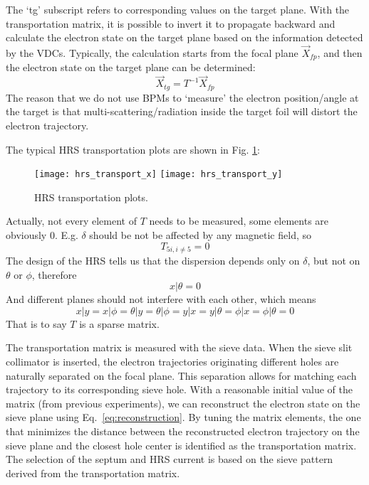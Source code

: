 The `tg' subscript refers to corresponding values on the target plane. 
With the transportation matrix, it is possible to invert it to propagate backward 
and calculate the electron state on the target plane based on the information
detected by the VDCs. Typically, the calculation starts from the focal plane $\vec{X}_{fp}$, 
and then the electron state on the target plane can be determined: 
\begin{equation}
    \vec{X}_{tg} = T^{-1} \vec{X}_{fp}
    \label{eq:reconstruction}
\end{equation}
The reason that we do not use BPMs to `measure' the electron position/angle at 
the target is that multi-scattering/radiation inside the target foil will 
distort the electron trajectory. 

The typical HRS transportation plots are shown in Fig. \ref{fig:hrs_transport}:
\begin{figure}[!h]
    \texttt{[image: hrs\_transport\_x]}
    \texttt{[image: hrs\_transport\_y]}
    \caption{HRS transportation plots. 
    } %
    \label{fig:hrs_transport}
\end{figure}

Actually, not every element of $T$ needs to be measured, some elements are obviously
0. E.g. $\delta$ should be not be affected by any magnetic field, so 
\begin{equation}
    T_{5i, i\ne 5} = 0
\end{equation}
The design of the HRS tells us that the dispersion depends only on $\delta$, but not
on $\theta$ or $\phi$, therefore 
\begin{equation}
    x|\theta = 0
\end{equation}
And different planes should not interfere with each other, which means 
\begin{equation}
    x|y = x|\phi = \theta|y = \theta|\phi = y|x = y|\theta = \phi|x = \phi|\theta = 0
\end{equation}
That is to say $T$ is a sparse matrix.

The transportation matrix is measured with the sieve data. 
When the sieve slit collimator is inserted, the electron trajectories
originating different holes are naturally separated on the focal plane. This
separation allows for matching each trajectory to its corresponding sieve hole. 
With a reasonable initial value of the matrix (from previous experiments),
we can reconstruct the electron state on the sieve plane using Eq.~\ref{eq:reconstruction}.
By tuning the matrix elements, the one that minimizes the distance between the 
reconstructed electron trajectory on the sieve plane and the closest hole center 
is identified as the transportation matrix. %
The selection of the septum and HRS current is based on the sieve pattern 
derived from the transportation matrix. 

